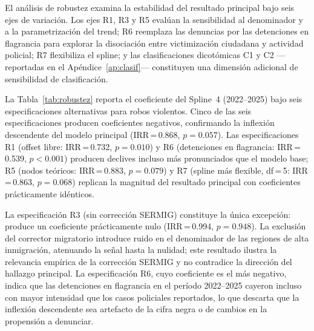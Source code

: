 \documentclass[12pt,a4paper]{article}
\begin{document}
El an\'alisis de robustez examina la estabilidad del resultado principal bajo seis ejes de variaci\'on. Los ejes R1, R3 y R5 eval\'uan la sensibilidad al denominador y a la parametrizaci\'on del trend; R6 reemplaza las denuncias por las detenciones en flagrancia para explorar la disociaci\'on entre victimizaci\'on ciudadana y actividad policial; R7 flexibiliza el spline; y las clasificaciones dicot\'omicas C1 y C2 ---reportadas en el Ap\'endice~\ref{ap:clasif}--- constituyen una dimensi\'on adicional de sensibilidad de clasificaci\'on.

La Tabla~\ref{tab:robustez} reporta el coeficiente del Spline~4 (2022--2025) bajo seis
especificaciones alternativas para robos violentos. Cinco de las seis especificaciones
producen coeficientes negativos, confirmando la inflexi\'on descendente del modelo
principal (IRR\,=\,0.868, $p=0.057$). Las especificaciones R1 (offset libre:
IRR\,=\,0.732, $p=0.010$) y R6 (detenciones en flagrancia: IRR\,=\,0.539, $p<0.001$)
producen declives incluso m\'as pronunciados que el modelo base; R5 (nodos te\'oricos:
IRR\,=\,0.883, $p=0.079$) y R7 (spline m\'as flexible, df\,=\,5: IRR\,=\,0.863,
$p=0.068$) replican la magnitud del resultado principal con coeficientes pr\'acticamente
id\'enticos.

La especificaci\'on R3 (sin correcci\'on SERMIG) constituye la \'unica excepci\'on:
produce un coeficiente pr\'acticamente nulo (IRR\,=\,0.994, $p=0.948$). La exclusi\'on
del corrector migratorio introduce ruido en el denominador de las regiones de alta
inmigraci\'on, atenuando la se\~nal hasta la nulidad; este resultado ilustra la
relevancia emp\'irica de la correcci\'on SERMIG y no contradice la direcci\'on del
hallazgo principal. La especificaci\'on R6, cuyo coeficiente es el m\'as negativo,
indica que las detenciones en flagrancia en el per\'iodo 2022--2025 cayeron incluso
con mayor intensidad que los casos policiales reportados, lo que descarta que la
inflexi\'on descendente sea artefacto de la cifra negra o de cambios en la propensi\'on
a denunciar.
\end{document}
